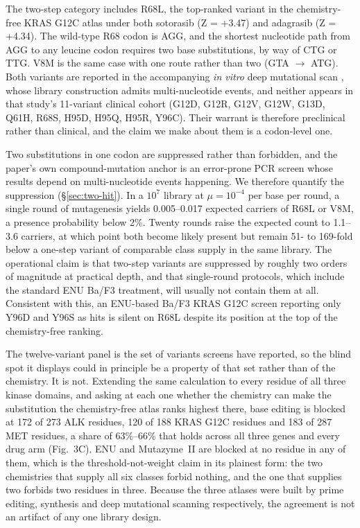 \documentclass[11pt,a4paper]{article}
\begin{document}
The two-step category includes R68L, the top-ranked variant in the
chemistry-free KRAS G12C atlas under both sotorasib (Z = +3.47) and
adagrasib (Z = +4.34). The wild-type R68 codon is AGG, and the shortest
nucleotide path from AGG to any leucine codon requires two base
substitutions, by way of CTG or TTG. V8M is the same case with one
route rather than two (GTA $\to$ ATG). Both variants are reported in
the accompanying \textit{in vitro} deep mutational scan
\citep{awad2021}, whose library construction admits multi-nucleotide
events, and neither appears in that study's 11-variant clinical cohort
(G12D, G12R, G12V, G12W, G13D, Q61H, R68S, H95D, H95Q, H95R, Y96C).
Their warrant is therefore preclinical rather than clinical, and the
claim we make about them is a codon-level one.

Two substitutions in one codon are suppressed rather than forbidden,
and the paper's own compound-mutation anchor \citep{takei2025} is an
error-prone PCR screen whose results depend on multi-nucleotide
events happening. We therefore quantify the suppression (\S\ref{sec:two-hit}). In
a $10^7$ library at $\mu = 10^{-4}$ per base per round, a single round
of mutagenesis yields 0.005--0.017 expected carriers of R68L or V8M,
a presence probability below 2\%. Twenty rounds raise the expected
count to 1.1--3.6 carriers, at which point both become likely present
but remain 51- to 169-fold below a one-step variant of comparable
class supply in the same library. The operational claim is that
two-step variants are suppressed by roughly two orders of magnitude at
practical depth, and that single-round protocols, which include the
standard ENU Ba/F3 treatment, will usually not contain them at all.
Consistent with this, an ENU-based Ba/F3 KRAS G12C screen reporting
only Y96D and Y96S as hits \citep{tang2022boehringer} is silent on
R68L despite its position at the top of the chemistry-free ranking.

The twelve-variant panel is the set of variants screens have reported,
so the blind spot it displays could in principle be a property of that
set rather than of the chemistry. It is not. Extending the same
calculation to every residue of all three kinase domains, and asking at
each one whether the chemistry can make the substitution the
chemistry-free atlas ranks highest there, base editing is blocked at
172 of 273 ALK residues, 120 of 188 KRAS G12C residues and 183 of 287
MET residues, a share of 63\%--66\% that holds across all three genes
and every drug arm (Fig.~3C). ENU and Mutazyme~II are blocked at no
residue in any of them, which is the threshold-not-weight claim in its
plainest form: the two chemistries that supply all six classes forbid
nothing, and the one that supplies two forbids two residues in three.
Because the three atlases were built by prime editing, synthesis and
deep mutational scanning respectively, the agreement is not an artifact
of any one library design.
\end{document}
